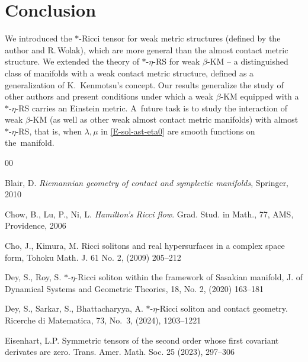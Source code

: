 \documentclass[11pt,a4paper,twoside]{article}
\begin{document}
{\section{Conclusion}

We introduced the $\ast$-Ricci tensor for weak metric structures (defined by the author and R.\,Wolak), which are more general than the almost contact metric structure. We extended the theory of $\ast$-$\eta$-RS for weak $\beta$-KM -- a distinguished class of manifolds with a weak contact metric structure,
defined as a generalization of K.~Kenmotsu's concept.
Our results generalize the study of other authors and present conditions under which a weak $\beta$-KM equipped with a $\ast$-$\eta$-RS carries an Einstein metric. A~future task is to study the interaction of weak $\beta$-KM (as well as other weak almost contact metric manifolds)
with almost $\ast$-$\eta$-RS, that is, when $\lambda,\mu$ in \eqref{E-sol-ast-eta0} are smooth functions on the~manifold.


\baselineskip=11.6pt

\begin{thebibliography}{00}

 Blair, D. {\it Riemannian geometry of contact and symplectic manifolds}, Springer, 2010

 Chow, B.,  Lu, P., Ni, L. {\em Hamilton's Ricci flow}. Grad. Stud. in Math., 77, AMS, Providence,
 2006

Cho, J., Kimura, M. {Ricci solitons and real hypersurfaces in a complex space form}, Tohoku Math. J. {61} No. 2, (2009) 205--212

Dey, S., Roy, S. $\ast$-$\eta$-Ricci soliton within the framework of Sasakian manifold, J. of Dynamical Systems and Geometric Theories, 18, No. 2, (2020) 163--181

Dey, S., Sarkar, S., Bhattacharyya, A.
$\ast$-$\eta$-Ricci soliton and contact geometry.
Ricerche di Matematica, 73, No.~3, (2024), 1203--1221



Eisenhart, L.P. Symmetric tensors of the second order whose first covariant derivates are zero.
Trans. Amer. Math. Soc.
25 (2023), 297--306


\end{thebibliography}}
\end{document}
